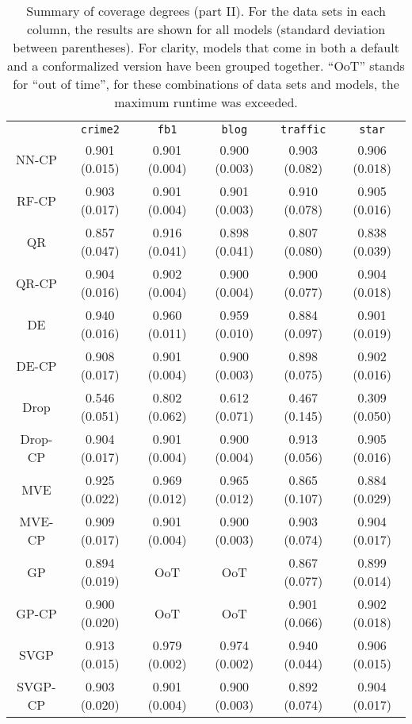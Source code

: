 \documentclass[smallcondensed]{svjour3}
\begin{document}
\begin{appendices}
    \begin{table}[ht!]
        \scriptsize
        \centering
        \renewcommand{\arraystretch}{1.5}
        \begin{tabular}{c||c|c|c|c|c}
            &\texttt{crime2}&\texttt{fb1}&\texttt{blog}&\texttt{traffic}&\texttt{star}\\
            \hhline{======}
            NN-CP&0.901 (0.015)&0.901 (0.004)&0.900 (0.003)&0.903 (0.082)&0.906 (0.018)\\
            \hdashline
            RF-CP&0.903 (0.017)&0.901 (0.004)&0.901 (0.003)&0.910 (0.078)&0.905 (0.016)\\
            \hdashline
            QR&0.857 (0.047)&0.916 (0.041)&0.898 (0.041)&0.807 (0.080)&0.838 (0.039)\\
            QR-CP&0.904 (0.016)&0.902 (0.004)&0.900 (0.004)&0.900 (0.077)&0.904 (0.018)\\
            \hdashline
            DE&0.940 (0.016)&0.960 (0.011)&0.959 (0.010)&0.884 (0.097)&0.901 (0.019)\\
            DE-CP&0.908 (0.017)&0.901 (0.004)&0.900 (0.003)&0.898 (0.075)&0.902 (0.016)\\
            \hdashline
            Drop&0.546 (0.051)&0.802 (0.062)&0.612 (0.071)&0.467 (0.145)&0.309 (0.050)\\
            Drop-CP&0.904 (0.017)&0.901 (0.004)&0.900 (0.004)&0.913 (0.056)&0.905 (0.016)\\
            \hdashline
            MVE&0.925 (0.022)&0.969 (0.012)&0.965 (0.012)&0.865 (0.107)&0.884 (0.029)\\
            MVE-CP&0.909 (0.017)&0.901 (0.004)&0.900 (0.003)&0.903 (0.074)&0.904 (0.017)\\
            \hdashline
            GP&0.894 (0.019)&OoT&OoT&0.867 (0.077)&0.899 (0.014)\\
            GP-CP&0.900 (0.020)&OoT&OoT&0.901 (0.066)&0.902 (0.018)\\
            \hdashline
            SVGP&0.913 (0.015)&0.979 (0.002)&0.974 (0.002)&0.940 (0.044)&0.906 (0.015)\\
            SVGP-CP&0.903 (0.020)&0.901 (0.004)&0.900 (0.003)&0.892 (0.074)&0.904 (0.017)\\
        \end{tabular}
        \caption{Summary of coverage degrees (part II). For the data sets in each column, the results are shown for all models (standard deviation between parentheses). For clarity, models that come in both a default and a conformalized version have been grouped together. ``OoT'' stands for ``out of time'', for these combinations of data sets and models, the maximum runtime was exceeded.}
        \label{table:coverage2}
    \end{table}


\end{appendices}
\end{document}
